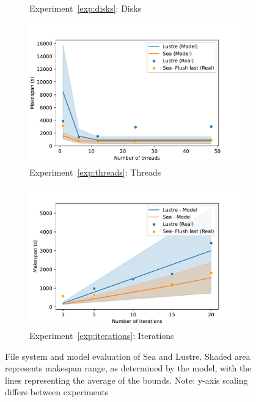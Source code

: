 \documentclass{report}
\begin{document}
\begin{figure}
\begin{subfigure}{0.5\textwidth}
            \caption{Experiment~\ref{exp:disks}: Disks}
            \label{fig:disks}
        \end{subfigure}
        \begin{subfigure}{0.5\textwidth}
            \centering
            \includegraphics[width=0.8\linewidth]{figures/threads.pdf}
            \caption{Experiment~\ref{exp:threads}: Threads}
            \label{fig:threads}
        \end{subfigure}
        \begin{subfigure}{0.5\textwidth}
            \centering
            \includegraphics[width=0.8\linewidth]{figures/iterations.pdf}
            \caption{Experiment~\ref{exp:iterations}: Iterations}
            \label{fig:iterations}
        \end{subfigure}
        \caption{File system and model evaluation of Sea and Lustre. Shaded
        area represents makespan range, as determined by the model, with the
        lines representing the average of the bounds. Note: y-axis scaling differs between experiments}

    \label{fig:seaexp}
\end{figure}
\end{document}
